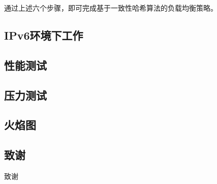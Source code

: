 \documentclass[twoside]{CUGThesis}
\begin{document}
	\par 
	通过上述六个步骤，即可完成基于一致性哈希算法的负载均衡策略。

	\subsection{IPv6环境下工作}

	\begin{spacing}{2}
		\section{性能测试}
	\end{spacing}
	\subsection{压力测试}

	\subsection{火焰图}
	
	
	\begin{spacing}{2}
		\section*{致谢}
	\end{spacing}
	
	致谢
	
	\clearpage
	
	
	
\end{document}
